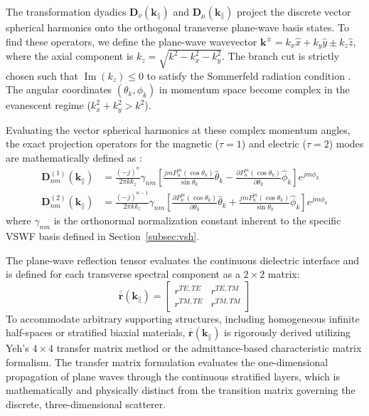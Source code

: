 \documentclass[11pt,a4paper]{article}
\begin{document}
The transformation dyadics $\mathbf{D}_{\nu}(\mathbf{k}_{\parallel})$ and $\mathbf{D}_{\mu}(\mathbf{k}_{\parallel})$ project the discrete vector spherical harmonics onto the orthogonal transverse plane-wave basis states. To find these operators, we define the plane-wave wavevector $\mathbf{k}^{\pm} = k_x \hat{x} + k_y \hat{y} \pm k_z \hat{z}$, where the axial component is $k_z = \sqrt{k^2 - k_x^2 - k_y^2}$. The branch cut is strictly chosen such that $\operatorname{Im}(k_z) \le 0$ to satisfy the Sommerfeld radiation condition \cite{jackson1999classical}. The angular coordinates $(\theta_k, \phi_k)$ in momentum space become complex in the evanescent regime ($k_x^2 + k_y^2 > k^2$).

Evaluating the vector spherical harmonics at these complex momentum angles, the exact projection operators for the magnetic ($\tau=1$) and electric ($\tau=2$) modes are mathematically defined as \cite{tsang2001scattering}:
\begin{align}
    \mathbf{D}_{nm}^{(1)}(\mathbf{k}_{\parallel}) &= \frac{(-j)^n}{2\pi k k_z} \gamma_{nm} \left[ \frac{j m P_n^m(\cos\theta_k)}{\sin\theta_k} \hat{\theta}_k - \frac{\partial P_n^m(\cos\theta_k)}{\partial\theta_k} \hat{\phi}_k \right] e^{jm\phi_k} \\
    \mathbf{D}_{nm}^{(2)}(\mathbf{k}_{\parallel}) &= \frac{(-j)^{n-1}}{2\pi k k_z} \gamma_{nm} \left[ \frac{\partial P_n^m(\cos\theta_k)}{\partial\theta_k} \hat{\theta}_k + \frac{j m P_n^m(\cos\theta_k)}{\sin\theta_k} \hat{\phi}_k \right] e^{jm\phi_k}
\end{align}
where $\gamma_{nm}$ is the orthonormal normalization constant inherent to the specific VSWF basis defined in Section~\ref{subsec:vsh}.

The plane-wave reflection tensor evaluates the continuous dielectric interface and is defined for each transverse spectral component as a $2 \times 2$ matrix:
\begin{equation}
    \overline{\overline{\mathbf{r}}}(\mathbf{k}_{\parallel}) = \begin{bmatrix} r^{TE,TE} & r^{TE,TM} \\ r^{TM,TE} & r^{TM,TM} \end{bmatrix}
\end{equation}
To accommodate arbitrary supporting structures, including homogeneous infinite half-spaces or stratified biaxial materials, $\overline{\overline{\mathbf{r}}}(\mathbf{k}_{\parallel})$ is rigorously derived utilizing Yeh's $4 \times 4$ transfer matrix method or the admittance-based characteristic matrix formalism. The transfer matrix formulation evaluates the one-dimensional propagation of plane waves through the continuous stratified layers, which is mathematically and physically distinct from the transition matrix governing the discrete, three-dimensional scatterer. 
\end{document}
